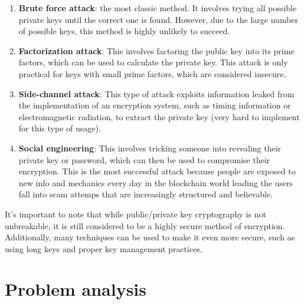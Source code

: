 \documentclass[target=mst,aauheader=]{thud}
\begin{document}
    \begin{enumerate}

        \item \textbf{Brute force attack}: the most classic method. It involves trying all possible private keys until the correct one is found. However, due to the large number of possible keys, this method is highly unlikely to succeed.
        \item \textbf{Factorization attack}: This involves factoring the public key into its prime factors, which can be used to calculate the private key. This attack is only practical for keys with small prime factors, which are considered insecure.
        \item \textbf{Side-channel attack}: This type of attack exploits information leaked from the implementation of an encryption system, such as timing information or electromagnetic radiation, to extract the private key (very hard to implement for this type of usage).
        \item \textbf{Social engineering}: This involves tricking someone into revealing their private key or password, which can then be used to compromise their encryption. This is the most successful attack because people are exposed to new info and mechanics every day in the blockchain world leading the users fall into scam attemps that are increasingly structured and believable.

    \end{enumerate}

    It's important to note that while public/private key cryptography is not unbreakable, it is still considered to be a highly secure method of encryption. Additionally, many techniques can be used to make it even more secure, such as using long keys and proper key management practices.
    







\chapter{Problem analysis}
\end{document}
